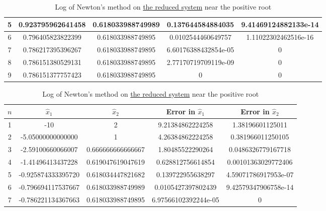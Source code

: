 \begin{table}[H]
\begin{table}[H]
\begin{table}[H]
\begin{table}[htbp]
\begin{subtable}[t]{\textwidth}
\begin{tabular}{|c|c|c|c|c|}
		5	&	\footnotesize	0.923795962641458	&	\footnotesize	0.618033988749989	&	\footnotesize	0.137644584884035		&	\footnotesize	9.41469124882133e-14	\\	\hline
		6	&	\footnotesize	0.796405823822399	&	\footnotesize	0.618033988749895	&	\footnotesize	0.0102544460649757		&	\footnotesize	1.11022302462516e-16	\\	\hline
		7	&	\footnotesize	0.786217395396267	&	\footnotesize	0.618033988749895	&	\footnotesize	6.60176388432854e-05	&	\footnotesize	0						\\	\hline
		8	&	\footnotesize	0.786151380529131	&	\footnotesize	0.618033988749895	&	\footnotesize	2.77170719709119e-09	&	\footnotesize	0						\\	\hline
		9	&	\footnotesize	0.786151377757423	&	\footnotesize	0.618033988749895	&	\footnotesize	0						&	\footnotesize	0						\\	\hline
		\end{tabular}
	\caption{Log of Newton's method on \hyperref[eqn1reduce]{the reduced system} near the positive root}
	\label{logeqn1nt+}
	\end{subtable}	
	\begin{subtable}[t]{\textwidth}
		\centering
		\begin{tabular}{|c|c|c|c|c|}
		\hline
		\(n\)	&	\(\hat{x}_1\)	&	\(\hat{x}_2\)	&	Error in \(\hat{x}_1\)	&	Error in \(\hat{x}_2\)		\\	\hline
		1	&	\footnotesize	-10					&	\footnotesize	2					&	\footnotesize	9.21384862224258		&	\footnotesize	1.38196601125011		\\	\hline
		2	&	\footnotesize	-5.05000000000000	&	\footnotesize	1					&	\footnotesize	4.26384862224258		&	\footnotesize	0.381966011250105		\\	\hline
		3	&	\footnotesize	-2.59100660066007	&	\footnotesize	0.666666666666667	&	\footnotesize	1.80485522290264		&	\footnotesize	0.0486326779167718		\\	\hline
		4	&	\footnotesize	-1.41496413437228	&	\footnotesize	0.619047619047619	&	\footnotesize	0.628812756614854		&	\footnotesize	0.00101363029772406		\\	\hline
		5	&	\footnotesize	-0.925874333395720	&	\footnotesize	0.618034447821682	&	\footnotesize	0.139722955638297		&	\footnotesize	4.59071786917953e-07	\\	\hline
		6	&	\footnotesize	-0.796694117537667	&	\footnotesize	0.618033988749989	&	\footnotesize	0.0105427397802439		&	\footnotesize	9.42579347906758e-14	\\	\hline
		7	&	\footnotesize	-0.786221134367663	&	\footnotesize	0.618033988749895	&	\footnotesize	6.97566102392244e-05	&	\footnotesize	0						\\	\hline

\end{tabular}
\end{subtable}
\end{table}
\end{table}
\end{table}
\end{table}
